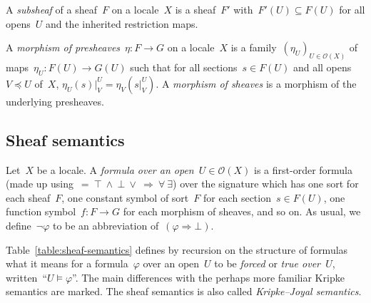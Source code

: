 \documentclass{ws-rv9x6}
\renewcommand{\O}{\mathcal{O}}
\newcommand{\CC}{\mathbb{C}}
\renewcommand{\_}{\mathpunct{.}}
\newcommand{\?}{\,{:}\,}
\begin{document}
\begin{definition}A \emph{subsheaf} of a sheaf~$F$ on a locale~$X$ is a
sheaf~$F'$ with~$F'(U) \subseteq F(U)$ for all opens~$U$ and the inherited
restriction maps.\end{definition}

\begin{definition}A \emph{morphism of presheaves}~$\eta : F \to G$ on a
locale~$X$ is a family~$(\eta_U)_{U \in \O(X)}$ of maps~$\eta_U : F(U) \to
G(U)$ such that for all sections~$s \in F(U)$ and all opens~$V \preceq U$
of~$X$, $\eta_U(s)|^U_V = \eta_V(s|^U_V)$. A \emph{morphism of sheaves} is a
morphism of the underlying presheaves.
\end{definition}


\subsection{Sheaf semantics}
\label{sect:sheaf-semantics}



Let~$X$ be a locale. A \emph{formula over an open~$U \in \O(X)$} is a
first-order formula (made up using~${=}\ {\top}\ {\wedge}\ {\bot}\ {\vee}\
{\Rightarrow}\ {\forall}\ {\exists}$) over the signature which has one sort for
each sheaf~$F$, one constant symbol of sort~$F$ for each section~$s \in F(U)$,
one function symbol~$f : F \to G$ for each morphism of sheaves, and so on. As
usual, we define~$\neg\varphi$ to be an abbreviation of~$(\varphi \Rightarrow
\bot)$.

Table~\ref{table:sheaf-semantics} defines by recursion on the structure of
formulas what it means for a formula~$\varphi$ over an open~$U$ to be
\emph{forced} or \emph{true over~$U$}, written~``$U \models \varphi$''. The
main differences with the perhaps more familiar Kripke semantics are marked.
The sheaf semantics is also called \emph{Kripke--Joyal semantics}.
\end{document}
